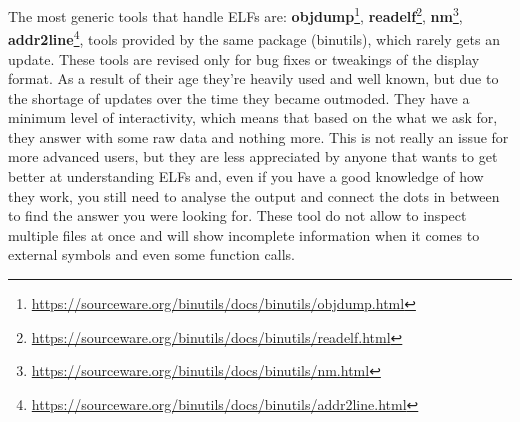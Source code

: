 The most generic tools that handle ELFs are: \textbf{objdump}\footnote{\url{https://sourceware.org/binutils/docs/binutils/objdump.html}}, \textbf{readelf}\footnote{\url{https://sourceware.org/binutils/docs/binutils/readelf.html}}, \textbf{nm}\footnote{\url{https://sourceware.org/binutils/docs/binutils/nm.html}}, \textbf{addr2line}\footnote{\url{https://sourceware.org/binutils/docs/binutils/addr2line.html}}, tools provided by the same package (binutils), which rarely gets an update. These tools are revised only for bug fixes or tweakings of the display format. As a result of their age they're heavily used and well known, but due to the shortage of updates over the time they became outmoded. They have a minimum level of interactivity, which means that based on the what we ask for, they answer with some raw data and nothing more. This is not really an issue for more advanced users, but they are less appreciated by anyone that wants to get better at understanding ELFs and, even if you have a good knowledge of how they work, you still need to analyse the output and connect the dots in between to find the answer you were looking for. These tool do not allow to inspect multiple files at once and will show incomplete information when it comes to external symbols and even some function calls.

